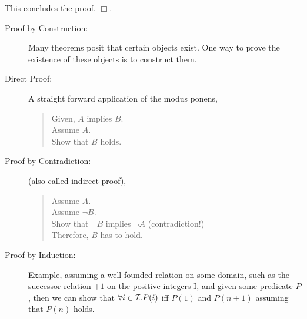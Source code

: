\documentclass[a4paper,blends,pdf,colorBG,slideColor]{prosper}
\begin{document}
This concludes the proof. $\Box$.
\es

\begin{description}
\item[Proof by Construction:] Many theorems posit that certain objects exist.  One way
to prove the existence of these objects is to construct them.

\item[Direct Proof:] A straight forward application of the modus ponens, 
{\scriptsize
\begin{quote}
Given, $A$ implies $B$.\\
Assume $A$.\\
Show that $B$ holds.
\end{quote}
}

\item[Proof by Contradiction:] (also called indirect proof),
{\scriptsize
\begin{quote}
Assume $A$.\\
Assume $\neg B$.\\
Show that $\neg B$ implies $\neg A$ (contradiction!)\\
Therefore, $B$ has to hold.
\end{quote}
}

\item[Proof by Induction:] Example, assuming a well-founded relation on some domain, such as the
successor relation $+1$ on the positive integers {\cal I}, and given some predicate  $P$,
then we can show that $\forall i \in {\cal I}.P(i)$ iff $P(1)$ and $P(n+1)$ assuming that
$P(n)$ holds.
\end{description}
\es
\end{document}
